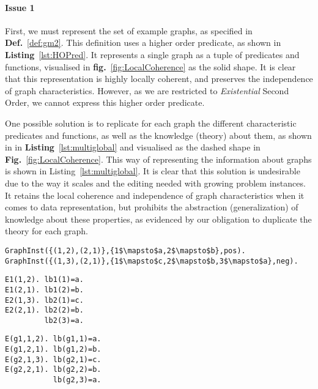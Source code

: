 \paragraph{Issue 1}
First, we must represent the set of example graphs, as specified in \textbf{Def.}~\ref{def:gm2}. 
This definition uses a higher order predicate, as shown in \textbf{Listing}~\ref{lst:HOPred}. 
It represents a single graph as a tuple of predicates and functions, visualised in \textbf{fig.}~\ref{fig:LocalCoherence} as the solid shape.
It is clear that this representation is highly locally coherent, and preserves the independence of graph characteristics.
However, as we are restricted to \emph{Existential} Second Order, we cannot express this higher order predicate.

One possible solution is to replicate for each graph the different characteristic predicates and functions, as well as the knowledge (theory) about them, as shown in
in \textbf{Listing}~\ref{lst:multiglobal} and visualised as the dashed shape in \textbf{Fig.}~\ref{fig:LocalCoherence}.
This way of representing the information about graphs is shown in Listing~\ref{lst:multiglobal}.
It is clear that this solution is undesirable due to the way it scales and the editing needed with growing problem instances.
It retains the local coherence and independence of graph characteristics when it comes to data representation, but prohibits the abstraction (generalization) of knowledge about these properties, as evidenced by our obligation to duplicate the theory for each graph.

\begin{lstlisting}[mathescape,caption=Higher order predicate modeling the set $\graphset{G}$ of Def~\ref{def:gm2}.,label=lst:HOPred]
GraphInst({(1,2),(2,1)},{1$\mapsto$a,2$\mapsto$b},pos).
GraphInst({(1,3),(2,1)},{1$\mapsto$c,2$\mapsto$b,3$\mapsto$a},neg).
\end{lstlisting}
\begin{minipage}[t]{0.5\textwidth}
\begin{lstlisting}[mathescape,caption=Multiple global relations,label=lst:multiglobal]
E1(1,2). lb1(1)=a.
E1(2,1). lb1(2)=b.
E2(1,3). lb2(1)=c.
E2(2,1). lb2(2)=b.
         lb2(3)=a.
\end{lstlisting}
\end{minipage}
\begin{minipage}[t]{0.5\textwidth}
\begin{lstlisting}[mathescape,caption=Indexed global relation,label=lst:indexedglobal]
E(g1,1,2). lb(g1,1)=a.
E(g1,2,1). lb(g1,2)=b.
E(g2,1,3). lb(g2,1)=c.
E(g2,2,1). lb(g2,2)=b.
           lb(g2,3)=a.
\end{lstlisting}
\end{minipage}




